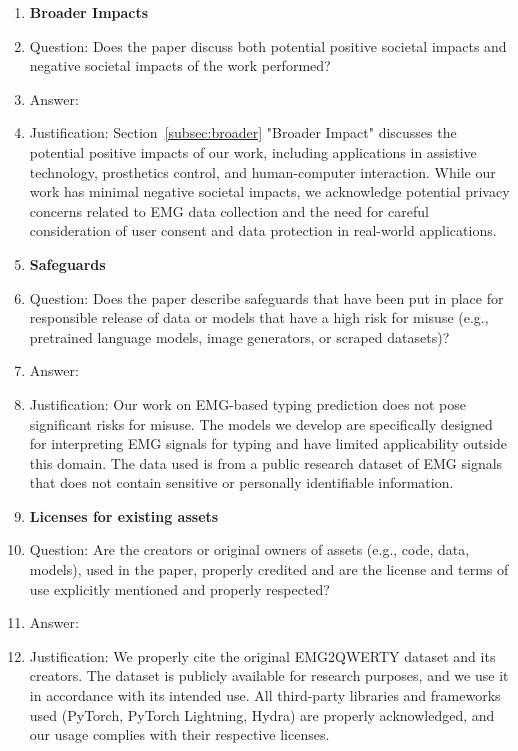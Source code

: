 \begin{enumerate}
    \item {\bf Broader Impacts}
    \item[] Question: Does the paper discuss both potential positive societal impacts and negative societal impacts of the work performed?
    \item[] Answer: \answerYes{}
    \item[] Justification: Section~\ref{subsec:broader} "Broader Impact" discusses the potential positive impacts of our work, including applications in assistive technology, prosthetics control, and human-computer interaction. While our work has minimal negative societal impacts, we acknowledge potential privacy concerns related to EMG data collection and the need for careful consideration of user consent and data protection in real-world applications.

    \item {\bf Safeguards}
    \item[] Question: Does the paper describe safeguards that have been put in place for responsible release of data or models that have a high risk for misuse (e.g., pretrained language models, image generators, or scraped datasets)?
    \item[] Answer: \answerNA{}
    \item[] Justification: Our work on EMG-based typing prediction does not pose significant risks for misuse. The models we develop are specifically designed for interpreting EMG signals for typing and have limited applicability outside this domain. The data used is from a public research dataset of EMG signals that does not contain sensitive or personally identifiable information.

    \item {\bf Licenses for existing assets}
    \item[] Question: Are the creators or original owners of assets (e.g., code, data, models), used in the paper, properly credited and are the license and terms of use explicitly mentioned and properly respected?
    \item[] Answer: \answerYes{}
    \item[] Justification: We properly cite the original EMG2QWERTY dataset and its creators. The dataset is publicly available for research purposes, and we use it in accordance with its intended use. All third-party libraries and frameworks used (PyTorch, PyTorch Lightning, Hydra) are properly acknowledged, and our usage complies with their respective licenses.


\end{enumerate}

